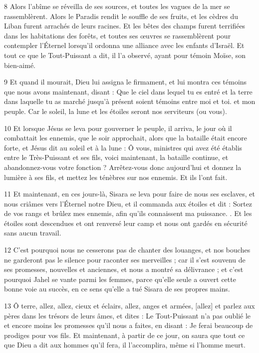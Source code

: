 \par 8 Alors l'abîme se réveilla de ses sources, et toutes les vagues de la mer se rassemblèrent. Alors le Paradis rendit le souffle de ses fruits, et les cèdres du Liban furent arrachés de leurs racines. Et les bêtes des champs furent terrifiées dans les habitations des forêts, et toutes ses œuvres se rassemblèrent pour contempler l'Éternel lorsqu'il ordonna une alliance avec les enfants d'Israël. Et tout ce que le Tout-Puissant a dit, il l'a observé, ayant pour témoin Moïse, son bien-aimé.

\par 9 Et quand il mourait, Dieu lui assigna le firmament, et lui montra ces témoins que nous avons maintenant, disant : Que le ciel dans lequel tu es entré et la terre dans laquelle tu as marché jusqu'à présent soient témoins entre moi et toi. et mon peuple. Car le soleil, la lune et les étoiles seront nos serviteurs (ou vous).

\par 10 Et lorsque Jésus se leva pour gouverner le peuple, il arriva, le jour où il combattait les ennemis, que le soir approchait, alors que la bataille était encore forte, et Jésus dit au soleil et à la lune : Ô vous, ministres qui avez été établis entre le Très-Puissant et ses fils, voici maintenant, la bataille continue, et abandonnez-vous votre fonction ? Arrêtez-vous donc aujourd'hui et donnez la lumière à ses fils, et mettez les ténèbres sur nos ennemis. Et ils l’ont fait.

\par 11 Et maintenant, en ces jours-là, Sisara se leva pour faire de nous ses esclaves, et nous criâmes vers l'Éternel notre Dieu, et il commanda aux étoiles et dit : Sortez de vos rangs et brûlez mes ennemis, afin qu'ils connaissent ma puissance. . Et les étoiles sont descendues et ont renversé leur camp et nous ont gardés en sécurité sans aucun travail.

\par 12 C'est pourquoi nous ne cesserons pas de chanter des louanges, et nos bouches ne garderont pas le silence pour raconter ses merveilles ; car il s'est souvenu de ses promesses, nouvelles et anciennes, et nous a montré sa délivrance ; et c'est pourquoi Jahel se vante parmi les femmes, parce qu'elle seule a ouvert cette bonne voie au succès, en ce sens qu'elle a tué Sisara de ses propres mains.

\par 13 Ô terre, allez, allez, cieux et éclairs, allez, anges et armées, [allez] et parlez aux pères dans les trésors de leurs âmes, et dites : Le Tout-Puissant n'a pas oublié le et encore moins les promesses qu'il nous a faites, en disant : Je ferai beaucoup de prodiges pour vos fils. Et maintenant, à partir de ce jour, on saura que tout ce que Dieu a dit aux hommes qu'il fera, il l'accomplira, même si l'homme meurt.


